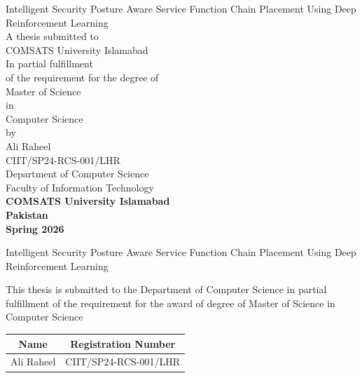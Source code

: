 \begin{center}
\vspace{0.1in}
\LARGE{Intelligent Security Posture Aware Service Function Chain Placement Using
Deep Reinforcement Learning} \\
\vspace{0.5in}
\Large{A thesis submitted to}\\
\vspace{0in}
\Large{COMSATS University Islamabad}\\
\vspace{0.3in}
\large{In partial fulfillment\\
of the requirement for the degree of}\\
\vspace{0.3in}
\large{Master of Science}\\
\large{in}\\
\large{Computer Science}\\
\vspace{0.2in}
\normalsize{by}\\
\large{Ali Raheel\\
\vspace{0.1in}
CIIT/SP24-RCS-001/LHR}\\
\vspace{0.2in}
\large{Department of Computer Science}\\
\large{Faculty of Information Technology}\\
\vspace{0.3in}
\Large {\textbf{COMSATS University Islamabad\\
Pakistan}}\\
\vspace{0.2in}
\Large{\textbf{Spring 2026}}
\end{center}

\newpage
\begin{center}
\LARGE{Intelligent Security Posture Aware Service Function Chain Placement Using
Deep Reinforcement Learning}\\
\end{center}
\vspace{0.2in}
\noindent\large{This thesis is submitted to the Department of Computer Science
in partial fulfillment of the requirement for the award of degree of Master of
Science in Computer Science}
\vspace{0.02in}
\begin{table}[!ht]
\centering
{\setlength{\arrayrulewidth}{.5mm}
\setlength{\tabcolsep}{53pt}
\renewcommand{\arraystretch}{2}
\begin{tabular}{|c|c|}
\hline
\rowcolor[HTML]{656565}
 \large{Name} &\large{Registration Number}  \\
 \hline
Ali Raheel & CIIT/SP24-RCS-001/LHR \\ \hline
\end{tabular}
}
\vspace{0.3in}
\end{table}
\vspace{2in}

